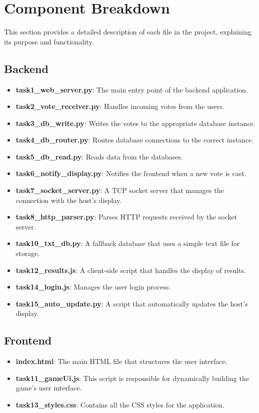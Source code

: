 \documentclass{article}
\begin{document}
\section{Component Breakdown}
This section provides a detailed description of each file in the project, explaining its purpose and functionality.

\subsection{Backend}
\begin{itemize}
    \item \textbf{task1\_web\_server.py}: The main entry point of the backend application.
    \item \textbf{task2\_vote\_receiver.py}: Handles incoming votes from the users.
    \item \textbf{task3\_db\_write.py}: Writes the votes to the appropriate database instance.
    \item \textbf{task4\_db\_router.py}: Routes database connections to the correct instance.
    \item \textbf{task5\_db\_read.py}: Reads data from the databases.
    \item \textbf{task6\_notify\_display.py}: Notifies the frontend when a new vote is cast.
    \item \textbf{task7\_socket\_server.py}: A TCP socket server that manages the connection with the host's display.
    \item \textbf{task8\_http\_parser.py}: Parses HTTP requests received by the socket server.
    \item \textbf{task10\_txt\_db.py}: A fallback database that uses a simple text file for storage.
    \item \textbf{task12\_results.js}: A client-side script that handles the display of results.
    \item \textbf{task14\_login.js}: Manages the user login process.
    \item \textbf{task15\_auto\_update.py}: A script that automatically updates the host's display.
\end{itemize}

\subsection{Frontend}
\begin{itemize}
    \item \textbf{index.html}: The main HTML file that structures the user interface.
    \item \textbf{task11\_gameUi.js}: This script is responsible for dynamically building the game's user interface.
    \item \textbf{task13\_styles.css}: Contains all the CSS styles for the application.
\end{itemize}
\end{document}

